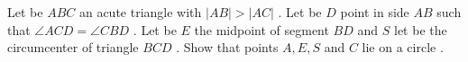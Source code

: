Let be $ABC$ an acute triangle with $|AB|>|AC|$ . Let be $D$ point in side $AB$ such that $\angle ACD=\angle CBD$ . Let be $E$ the midpoint of segment $BD$ and $S$ let be the circumcenter of triangle $BCD$ . Show that points $A,E,S$ and $C$ lie on a circle .